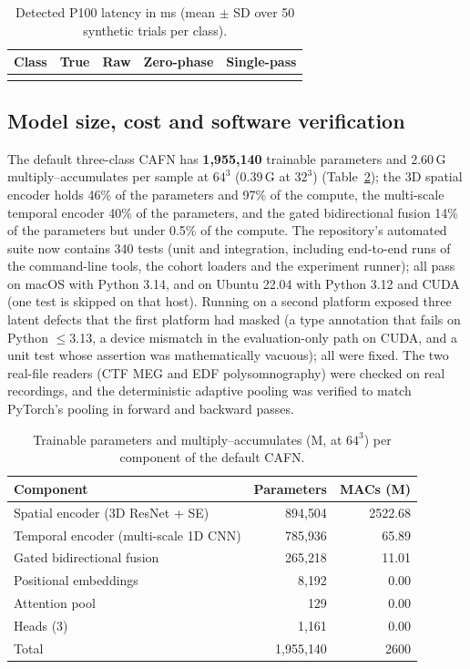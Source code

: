 \documentclass{ieeeaccessapprox}
\begin{document}
\begin{table}[!t]
\caption{Detected P100 latency in ms (mean $\pm$ SD over 50 synthetic trials per class).}
\label{tab:p100}
\centering\footnotesize
\begin{tabular}{@{}lcccc@{}}
\toprule
Class & True & Raw & Zero-phase & Single-pass\\
\midrule
\\
\bottomrule
\end{tabular}
\end{table}

\subsection{Model size, cost and software verification}
The default three-class CAFN has \textbf{1{,}955{,}140} trainable parameters and 2.60\,G multiply--accumulates per sample at $64^3$ (0.39\,G at $32^3$) (Table~\ref{tab:params}); the 3D spatial encoder holds 46\% of the parameters and 97\% of the compute, the multi-scale temporal encoder 40\% of the parameters, and the gated bidirectional fusion 14\% of the parameters but under 0.5\% of the compute. The repository's automated suite now contains 340 tests (unit and integration, including end-to-end runs of the command-line tools, the cohort loaders and the experiment runner); all pass on macOS with Python 3.14, and on Ubuntu 22.04 with Python 3.12 and CUDA (one test is skipped on that host). Running on a second platform exposed three latent defects that the first platform had masked (a type annotation that fails on Python $\le$3.13, a device mismatch in the evaluation-only path on CUDA, and a unit test whose assertion was mathematically vacuous); all were fixed. The two real-file readers (CTF MEG and EDF polysomnography) were checked on real recordings, and the deterministic adaptive pooling was verified to match PyTorch's pooling in forward and backward passes.

\begin{table}[!t]
\caption{Trainable parameters and multiply--accumulates (M, at $64^3$) per component of the default CAFN.}
\label{tab:params}
\centering\footnotesize
\begin{tabular}{@{}lrr@{}}
\toprule
Component & Parameters & MACs (M)\\
\midrule
Spatial encoder (3D ResNet + SE) & 894{,}504 & 2522.68 \\
Temporal encoder (multi-scale 1D CNN) & 785{,}936 & 65.89 \\
Gated bidirectional fusion & 265{,}218 & 11.01 \\
Positional embeddings & 8{,}192 & 0.00 \\
Attention pool & 129 & 0.00 \\
Heads (3) & 1{,}161 & 0.00 \\
\midrule
Total & 1{,}955{,}140 & 2600 \\

\bottomrule
\end{tabular}
\end{table}
\end{document}
